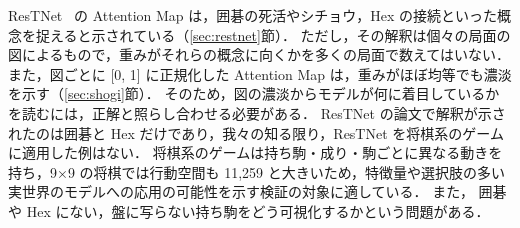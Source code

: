 \documentclass[submit]{ipsj}
\begin{document}
ResTNet~\cite{restnet} の Attention Map は，囲碁の死活やシチョウ，Hex の接続といった概念を捉えると示されている（\ref{sec:restnet}節）．
ただし，その解釈は個々の局面の図によるもので，重みがそれらの概念に向くかを多くの局面で数えてはいない．
また，図ごとに [0, 1] に正規化した Attention Map は，重みがほぼ均等でも濃淡を示す（\ref{sec:shogi}節）．
そのため，図の濃淡からモデルが何に着目しているかを読むには，正解と照らし合わせる必要がある．
ResTNet の論文で解釈が示されたのは囲碁と Hex だけであり，我々の知る限り，ResTNet を将棋系のゲームに適用した例はない．
将棋系のゲームは持ち駒・成り・駒ごとに異なる動きを持ち，9×9 の将棋では行動空間も 11,259 と大きいため，特徴量や選択肢の多い実世界のモデルへの応用の可能性を示す検証の対象に適している．
また，%
囲碁や Hex にない，盤に写らない持ち駒をどう可視化するかという問題がある．
\end{document}

